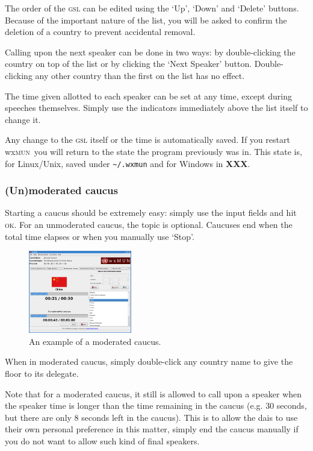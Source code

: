 \documentclass[11pt, a4paper]{article}
\newcommand\wxMUN{wx\textsc{mun}}
\begin{document}
The order of the \textsc{gsl} can be edited using the `Up', `Down' and `Delete' buttons. Because of the important nature of the list, you will be asked to confirm the deletion of a country to prevent accidental removal.

Calling upon the next speaker can be done in two ways: by double-clicking the country on top of the list or by clicking the `Next Speaker' button. Double-clicking any other country than the first on the list has no effect.

The time given allotted to each speaker can be set at any time, except during speeches themselves. Simply use the indicators immediately above the list itself to change it.

Any change to the \textsc{gsl} itself or the time is automatically saved. If you restart \wxMUN\ you will return to the state the program previously was in. This state is, for Linux/Unix, saved under \texttt{\~{}/.wxmun} and for Windows in \textbf{XXX}.

\subsubsection{(Un)moderated caucus}
Starting a caucus should be extremely easy: simply use the input fields and hit \textsc{ok}. For an unmoderated caucus, the topic is optional. Caucuses end when the total time elapses or when you manually use `Stop'. 

\begin{figure}
\includegraphics[width=0.40\textwidth]{screenshots/mod_caucus.png}
\caption{An example of a moderated caucus.}
\end{figure}

When in moderated caucus, simply double-click any country name to give the floor to its delegate.

Note that for a moderated caucus, it still is allowed to call upon a speaker when the speaker time is longer than the time remaining in the caucus (e.g. 30 seconds, but there are only 8 seconds left in the caucus). This is to allow the dais to use their own personal preference in this matter, simply end the caucus manually if you do not want to allow such kind of final speakers.
\end{document}
